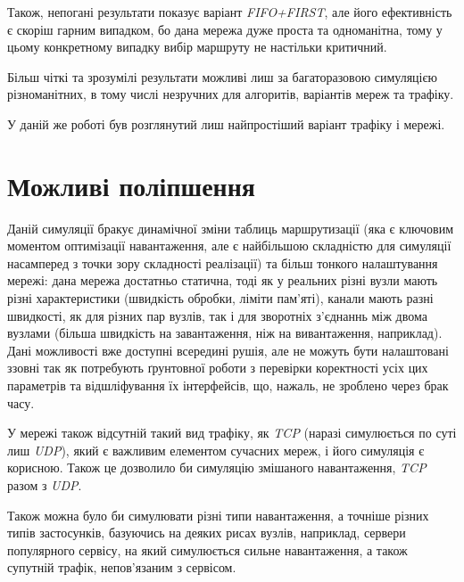 \documentclass[11pt,a4paper]{article}
\begin{document}
Також, непогані результати показує варіант \emph{FIFO+FIRST}, але його ефективність
є скоріш гарним випадком, бо дана мережа дуже проста та одноманітна, тому у цьому конкретному випадку вибір маршруту не настільки критичний.

Більш чіткі та зрозумілі результати можливі лиш за багаторазовою симуляцією
різноманітних, в тому числі незручних для алгоритів, варіантів мереж та трафіку.

У даній же роботі був розглянутий лиш найпростіший варіант трафіку і мережі.

\section{Можливі поліпшення}

Даній симуляції бракує динамічної зміни таблиць маршрутизації (яка є ключовим моментом оптимізації
навантаження, але є найбільшою складністю для симуляції насамперед з точки зору складності реалізації)
та більш тонкого налаштування мережі: дана мережа достатньо статична, тоді
як у реальних різні вузли мають різні характеристики (швидкість обробки, ліміти пам'яті), 
канали мають разні швидкості,
як для різних пар вузлів, так і для зворотніх з'єднаннь між двома вузлами (більша швидкість
на завантаження, ніж на вивантаження, наприклад).
Дані можливості вже доступні всередині рушія, але не можуть бути налаштовані ззовні
так як потребують ґрунтовної роботи з перевірки коректності усіх цих параметрів
та відшліфування їх інтерфейсів, що, нажаль, не зроблено через брак часу.

У мережі також відсутній такий вид трафіку, як \emph{TCP} (наразі симулюється по суті лиш
\emph{UDP}), який є важливим елементом сучасних мереж, і його симуляція є корисною. Також
це дозволило би симуляцію змішаного навантаження, \emph{TCP} разом з \emph{UDP}.

Також можна було би симулювати різні типи навантаження, а точніше різних типів застосунків, базуючись на деяких рисах вузлів, наприклад, сервери популярного сервісу, на який симулюється сильне навантаження, а також супутній трафік, непов'язаним з сервісом.
\end{document}
